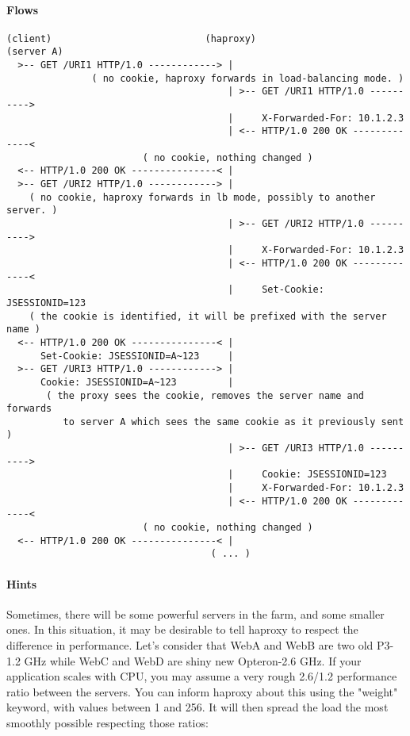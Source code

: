 \paragraph{Flows}

\begin{verbatim}
(client)                           (haproxy)                         (server A)
  >-- GET /URI1 HTTP/1.0 ------------> |
               ( no cookie, haproxy forwards in load-balancing mode. )
                                       | >-- GET /URI1 HTTP/1.0 ---------->
                                       |     X-Forwarded-For: 10.1.2.3
                                       | <-- HTTP/1.0 200 OK -------------<
                        ( no cookie, nothing changed )
  <-- HTTP/1.0 200 OK ---------------< |
  >-- GET /URI2 HTTP/1.0 ------------> |
    ( no cookie, haproxy forwards in lb mode, possibly to another server. )
                                       | >-- GET /URI2 HTTP/1.0 ---------->
                                       |     X-Forwarded-For: 10.1.2.3
                                       | <-- HTTP/1.0 200 OK -------------<
                                       |     Set-Cookie: JSESSIONID=123
    ( the cookie is identified, it will be prefixed with the server name )
  <-- HTTP/1.0 200 OK ---------------< |
      Set-Cookie: JSESSIONID=A~123     |
  >-- GET /URI3 HTTP/1.0 ------------> |
      Cookie: JSESSIONID=A~123         |
       ( the proxy sees the cookie, removes the server name and forwards
          to server A which sees the same cookie as it previously sent )
                                       | >-- GET /URI3 HTTP/1.0 ---------->
                                       |     Cookie: JSESSIONID=123
                                       |     X-Forwarded-For: 10.1.2.3
                                       | <-- HTTP/1.0 200 OK -------------<
                        ( no cookie, nothing changed )
  <-- HTTP/1.0 200 OK ---------------< |
                                    ( ... )
\end{verbatim}

\paragraph{Hints}

Sometimes, there will be some powerful servers in the farm, and some smaller
ones. In this situation, it may be desirable to tell haproxy to respect the
difference in performance. Let's consider that WebA and WebB are two old
P3-1.2 GHz while WebC and WebD are shiny new Opteron-2.6 GHz. If your
application scales with CPU, you may assume a very rough 2.6/1.2 performance
ratio between the servers. You can inform haproxy about this using the "weight"
keyword, with values between 1 and 256. It will then spread the load the most
smoothly possible respecting those ratios:


